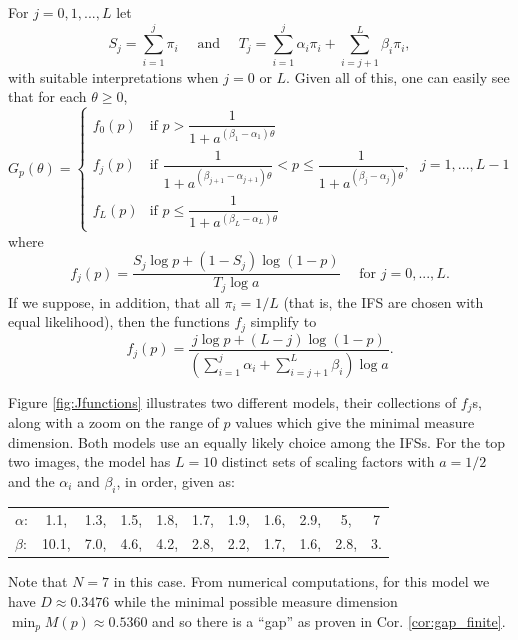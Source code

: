 \documentclass{amsart}
\theoremstyle{plain}
\numberwithin{equation}{section}
\begin{document}
For  $j=0,1,...,L$  let
\begin{equation*}
 S_j = \sum_{i=1}^j \pi_i \quad \mbox{ and } \quad T_{j}=\sum_{i=1}^{j}\alpha _{i}\pi_i+\sum_{i=j+1}^{L}\beta _{i}\pi_i,
\end{equation*}%
with suitable interpretations when $j = 0$ or $L$.
Given all of this, one can easily see that for each $\theta \geq 0$, 
\begin{equation*}
G_{p}(\theta )=\left\{ 
    \begin{array}{cc}
     f_{0}(p) & \text{if }p>\dfrac{1}{1+a^{(\beta _{1}-\alpha _{1})\theta }} \\[10pt]
    f_{j}(p) & \text{if }\dfrac{1}{1+a^{(\beta _{j+1}-\alpha _{j+1})\theta }}<p\leq \dfrac{1}{1+a^{(\beta _{j}-\alpha _{j})\theta }},\text{ }j=1,...,L-1
\\[10pt]
    f_{L}(p) & \text{if }p\leq \dfrac{1}{1+a^{(\beta _{L}-\alpha _{L})\theta }}
\end{array}
    \right. 
\end{equation*}
where 
\begin{equation*}
   f_{j}(p)=\frac{S_j\log p+(1-S_j) \log (1-p)}{ T_{j}\log a}\quad \text{ for } j=0,...,L. 
\end{equation*}
If we suppose, in addition, that all $\pi_i=1/L$ (that is, the
IFS are chosen with equal likelihood), then the functions $f_{j}$ simplify
to 
\begin{equation*}
    f_{j}(p)= \frac{j\log p+(L-j)\log (1-p)}{(\sum_{i=1}^{j}\alpha_{i}+\sum_{i=j+1}^{L}\beta _{i})\log a}.
\end{equation*}

\smallskip

Figure \ref{fig:Jfunctions} illustrates two different models, their collections of $f_j$s, 
along with a zoom on the range of $p$ values which give the minimal measure dimension.
Both models use an equally likely choice among the IFSs.
For the top two images, the model has $L = 10$ distinct sets of scaling factors with $a = 1/2$
and the $\alpha_i$ and $\beta_i$, in order, given as:

\smallskip

\begin{tabular}{l@{\hskip 0.2 cm}cccccccccc}
   $\alpha$:  & 1.1, & 1.3, & 1.5, & 1.8, & 1.7, & 1.9, & 1.6, & 2.9, & 5, & 7\\
   $\beta$:  & 10.1, & 7.0, & 4.6, & 4.2, & 2.8, & 2.2, & 1.7, & 1.6, & 2.8, & 3.
\end{tabular}
\smallskip

\noindent Note that $N = 7$ in this case.
From numerical computations, for this model we have $D \approx 0.3476$ while the 
minimal possible measure dimension $\min_p M(p) \approx 0.5360$ and so there is a ``gap'' as
proven in Cor. \ref{cor:gap_finite}.
\end{document}

